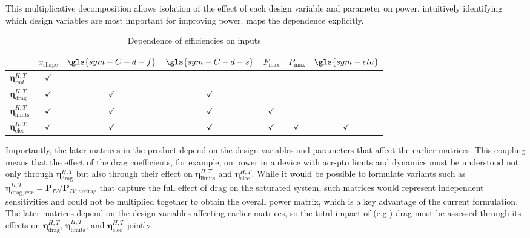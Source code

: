 \documentclass[a4paper,fleqn,colorlinks,unicode,lineno]{cas-dc} %
\makeatletter
\providecommand{\DIFaddtex}[1]{{\protect\color{blue}\uwave{#1}}} %
\providecommand{\DIFdeltex}[1]{{\protect\color{red}\sout{#1}}} %
\providecommand{\DIFaddFL}[1]{\DIFadd{#1}} %
\providecommand{\DIFdelFL}[1]{\DIFdel{#1}} %
\providecommand{\DIFaddbeginFL}{} %
\providecommand{\DIFaddendFL}{} %
\providecommand{\DIFdelbeginFL}{} %
\providecommand{\DIFdelendFL}{} %
\providecommand{\DIFadd}[1]{\texorpdfstring{\DIFaddtex{#1}}{#1}} %
\providecommand{\DIFdel}[1]{\texorpdfstring{\DIFdeltex{#1}}{}} %
\providecommand{\DIFscaledelfig}{0.5}
\newlength{\DIFdelgraphicswidth} %
\newlength{\DIFdelgraphicsheight} %
\providecommand{\DIFaddincludegraphics}[2][]{{\color{blue}\fbox{\DIFOincludegraphics[#1]{#2}}}} %
\providecommand{\DIFdelincludegraphics}[2][]{%
\sbox{\DIFdelgraphicsbox}{\DIFOincludegraphics[#1]{#2}}%
\settoboxwidth{\DIFdelgraphicswidth}{\DIFdelgraphicsbox} %
\settoboxtotalheight{\DIFdelgraphicsheight}{\DIFdelgraphicsbox} %
\scalebox{\DIFscaledelfig}{%
\parbox[b]{\DIFdelgraphicswidth}{\usebox{\DIFdelgraphicsbox}\\[-\baselineskip] \rule{\DIFdelgraphicswidth}{0em}}\llap{\resizebox{\DIFdelgraphicswidth}{\DIFdelgraphicsheight}{%
\setlength{\unitlength}{\DIFdelgraphicswidth}%
\begin{picture}(1,1)%
\thicklines\linethickness{2pt} %
{\color[rgb]{1,0,0}\put(0,0){\framebox(1,1){}}}%
{\color[rgb]{1,0,0}\put(0,0){\line( 1,1){1}}}%
{\color[rgb]{1,0,0}\put(0,1){\line(1,-1){1}}}%
\end{picture}%
}\hspace*{3pt}}} %
} %
\DeclareRobustCommand{\DIFaddbeginFL}{\DIFOaddbeginFL \let\includegraphics\DIFaddincludegraphics} %
\DeclareRobustCommand{\DIFaddendFL}{\DIFOaddendFL \let\includegraphics\DIFOincludegraphics} %
\DeclareRobustCommand{\DIFdelbeginFL}{\DIFOdelbeginFL \let\includegraphics\DIFdelincludegraphics} %
\DeclareRobustCommand{\DIFdelendFL}{\DIFOaddendFL \let\includegraphics\DIFOincludegraphics} %
\let\sout@orig\sout %
\renewcommand{\sout}[1]{\ifmmode\text{\sout@orig{\ensuremath{#1}}}\else\sout@orig{#1}\fi} %
\makeatother
\begin{document}
This multiplicative decomposition allows isolation of the effect of each design variable and parameter on power, intuitively identifying which design variables are most important for improving power.
 maps the dependence explicitly.
{
\renewcommand{\arraystretch}{1.35}
\begin{table}[h]
\centering
\caption{Dependence of efficiencies on inputs}\label{tab:power-matrix-dependence}
\begin{tabular}{lcccccc}
\hline
 & $x_{\text{shape}}$ & $\gls{sym-C-d-f}$  & $\gls{sym-C-d-s}$  & \DIFdelbeginFL \DIFdelFL{$F_{\text{max}}$ }\DIFdelendFL \DIFaddbeginFL \DIFaddFL{$\gls{sym-F-max}$ }\DIFaddendFL & \DIFdelbeginFL \DIFdelFL{$P_{\text{max}}$ }\DIFdelendFL \DIFaddbeginFL \DIFaddFL{$\gls{sym-P-max}$ }\DIFaddendFL & $\gls{sym-eta}$  \\
\hline
\DIFdelbeginFL \DIFdelFL{$\mathbf{\eta}^{H,T}_{rad}$   }\DIFdelendFL \DIFaddbeginFL \DIFaddFL{$\gls{sym-boldsymbol-eta-H-T-rad}$   }\DIFaddendFL & $\checkmark$ &  &  &  &  &  \\
\DIFdelbeginFL \DIFdelFL{$\mathbf{\eta}^{H,T}_{\text{drag}}$  }\DIFdelendFL \DIFaddbeginFL \DIFaddFL{$\gls{sym-boldsymbol-eta-H-T-drag}$  }\DIFaddendFL & $\checkmark$ & $\checkmark$ & $\checkmark$ &  &  &  \\
\DIFdelbeginFL \DIFdelFL{$\mathbf{\eta}^{H,T}_{\text{limits}}$ }\DIFdelendFL \DIFaddbeginFL \DIFaddFL{$\gls{sym-boldsymbol-eta-H-T-limits}$ }\DIFaddendFL & $\checkmark$ & $\checkmark$ & $\checkmark$ & $\checkmark$ &  &  \\
\DIFdelbeginFL \DIFdelFL{$\mathbf{\eta}^{H,T}_{\text{elec}}$  }\DIFdelendFL \DIFaddbeginFL \DIFaddFL{$\gls{sym-boldsymbol-eta-H-T-elec}$  }\DIFaddendFL & $\checkmark$ & $\checkmark$ & $\checkmark$ & $\checkmark$ & $\checkmark$ & $\checkmark$ \\
\hline
\end{tabular}
\end{table}
}

\ifdefined\DISSERTATION
    Importantly, the later matrices in the product depend on the design variables and parameters that affect the earlier matrices.
    This coupling means that the effect of the drag coefficients, for example, on power in a device with \gls{acr-pto} limits and dynamics must be understood not only through $\mathbf{\eta}^{H,T}_{\text{drag}}$ but also through their effect on $\mathbf{\eta}^{H,T}_{\text{limits}}$ and $\mathbf{\eta}^{H,T}_{\text{elec}}$.
    While it would be possible to formulate variants such as $\mathbf{\eta}^{H,T}_{\text{drag},var} = \mathbf{P}_{IV}/\mathbf{P}_{IV, no \text{drag}}$ that capture the full effect of drag on the saturated system, such matrices would represent independent sensitivities and could not be multiplied together to obtain the overall power matrix, which is a key advantage of the current formulation.
\else
    The later matrices depend on the design variables affecting earlier matrices, so the total impact of (e.g.) drag must be assessed through its effects on $\mathbf{\eta}^{H,T}_{\text{drag}}$, $\mathbf{\eta}^{H,T}_{\text{limits}}$, and $\mathbf{\eta}^{H,T}_{\text{elec}}$ jointly.
\fi
\end{document}
